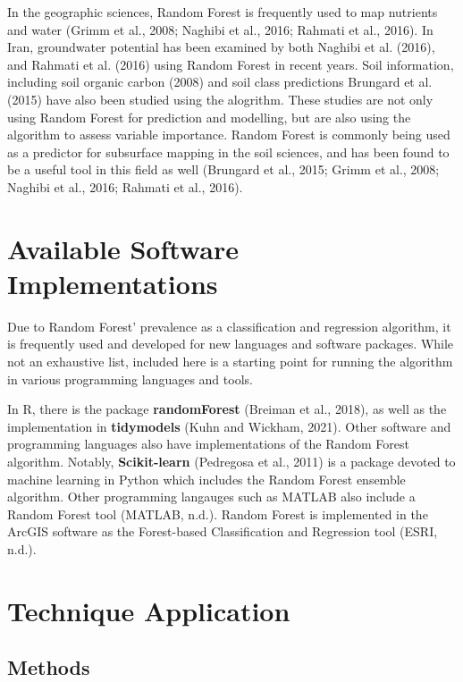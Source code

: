 \documentclass[
]{article}
\begin{document}
In the geographic sciences, Random Forest is frequently used to map nutrients and water (Grimm et al., 2008; Naghibi et al., 2016; Rahmati et al., 2016). In Iran, groundwater potential has been examined by both Naghibi et al. (2016), and Rahmati et al. (2016) using Random Forest in recent years. Soil information, including soil organic carbon (2008) and soil class predictions Brungard et al. (2015) have also been studied using the alogrithm. These studies are not only using Random Forest for prediction and modelling, but are also using the algorithm to assess variable importance. Random Forest is commonly being used as a predictor for subsurface mapping in the soil sciences, and has been found to be a useful tool in this field as well (Brungard et al., 2015; Grimm et al., 2008; Naghibi et al., 2016; Rahmati et al., 2016).

\hypertarget{available-software-implementations}{%
\section{Available Software Implementations}\label{available-software-implementations}}

Due to Random Forest' prevalence as a classification and regression algorithm, it is frequently used and developed for new languages and software packages. While not an exhaustive list, included here is a starting point for running the algorithm in various programming languages and tools.

In R, there is the package \textbf{randomForest} (Breiman et al., 2018), as well as the implementation in \textbf{tidymodels} (Kuhn and Wickham, 2021). Other software and programming languages also have implementations of the Random Forest algorithm. Notably, \textbf{Scikit-learn} (Pedregosa et al., 2011) is a package devoted to machine learning in Python which includes the Random Forest ensemble algorithm. Other programming langauges such as MATLAB also include a Random Forest tool (MATLAB, n.d.). Random Forest is implemented in the ArcGIS software as the Forest-based Classification and Regression tool (ESRI, n.d.).

\hypertarget{technique-application}{%
\section{Technique Application}\label{technique-application}}

\hypertarget{methods}{%
\subsection{Methods}\label{methods}}
\end{document}
